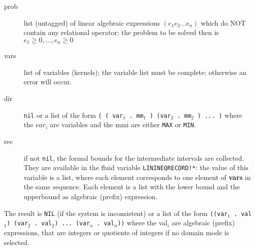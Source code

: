 \begin{description}
\item[prob] list (untagged) of linear algebraic expressions
$(e_1 e_2 \ldots e_n)$ which do NOT contain any relational
operator; the problem to be solved then is
$e_1 \ge 0, \ldots , e_n \ge 0$

\item[vars] list of variables (kernels); the variable list must be
complete; otherwise an error will occur.

\item[dir] {\tt nil} or a list of the form
{\tt ( ( var$_1$ . mm$_1$ ) (var$_2$ . mm$_2$ ) ... )}
where the $var_i$ are variables and the mmi are either
{\tt MAX} or {\tt MIN}.

\item[rec] if not {\tt nil}, the formal bounds for the intermediate
intervals are collected. They are available in the
fluid variable {\tt LININEQRECORD!*}: the value of this
variable is a list, where each element corresponds
to one element of {\bf vars} in the same sequence. Each
element is a list with the lower bound and the
upperbound as algebraic (prefix) expression.
\end{description}

The result is {\tt NIL} (if the system is inconsistent) or a list of the form
{\tt ((var$_1$ . val$_1$) (var$_2$ . val$_2$) ... (var$_n$ . val$_n$))}
where the val$_i$ are algebraic (prefix) expressions, that are integers
or quotients of integers if no domain mode is selected.


